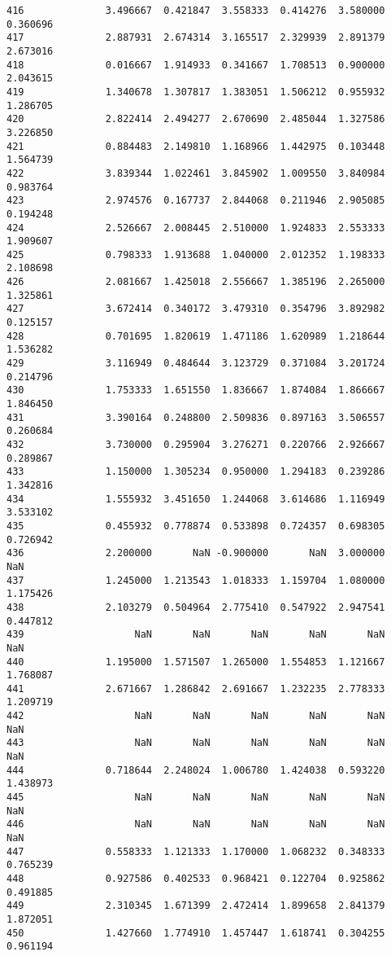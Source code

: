 \documentclass[11pt]{article}
\begin{document}
\begin{Verbatim}[commandchars=\\\{\}]
416              3.496667  0.421847  3.558333  0.414276  3.580000  0.360696
417              2.887931  2.674314  3.165517  2.329939  2.891379  2.673016
418              0.016667  1.914933  0.341667  1.708513  0.900000  2.043615
419              1.340678  1.307817  1.383051  1.506212  0.955932  1.286705
420              2.822414  2.494277  2.670690  2.485044  1.327586  3.226850
421              0.884483  2.149810  1.168966  1.442975  0.103448  1.564739
422              3.839344  1.022461  3.845902  1.009550  3.840984  0.983764
423              2.974576  0.167737  2.844068  0.211946  2.905085  0.194248
424              2.526667  2.008445  2.510000  1.924833  2.553333  1.909607
425              0.798333  1.913688  1.040000  2.012352  1.198333  2.108698
426              2.081667  1.425018  2.556667  1.385196  2.265000  1.325861
427              3.672414  0.340172  3.479310  0.354796  3.892982  0.125157
428              0.701695  1.820619  1.471186  1.620989  1.218644  1.536282
429              3.116949  0.484644  3.123729  0.371084  3.201724  0.214796
430              1.753333  1.651550  1.836667  1.874084  1.866667  1.846450
431              3.390164  0.248800  2.509836  0.897163  3.506557  0.260684
432              3.730000  0.295904  3.276271  0.220766  2.926667  0.289867
433              1.150000  1.305234  0.950000  1.294183  0.239286  1.342816
434              1.555932  3.451650  1.244068  3.614686  1.116949  3.533102
435              0.455932  0.778874  0.533898  0.724357  0.698305  0.726942
436              2.200000       NaN -0.900000       NaN  3.000000       NaN
437              1.245000  1.213543  1.018333  1.159704  1.080000  1.175426
438              2.103279  0.504964  2.775410  0.547922  2.947541  0.447812
439                   NaN       NaN       NaN       NaN       NaN       NaN
440              1.195000  1.571507  1.265000  1.554853  1.121667  1.768087
441              2.671667  1.286842  2.691667  1.232235  2.778333  1.209719
442                   NaN       NaN       NaN       NaN       NaN       NaN
443                   NaN       NaN       NaN       NaN       NaN       NaN
444              0.718644  2.248024  1.006780  1.424038  0.593220  1.438973
445                   NaN       NaN       NaN       NaN       NaN       NaN
446                   NaN       NaN       NaN       NaN       NaN       NaN
447              0.558333  1.121333  1.170000  1.068232  0.348333  0.765239
448              0.927586  0.402533  0.968421  0.122704  0.925862  0.491885
449              2.310345  1.671399  2.472414  1.899658  2.841379  1.872051
450              1.427660  1.774910  1.457447  1.618741  0.304255  0.961194

\end{Verbatim}
\end{document}
